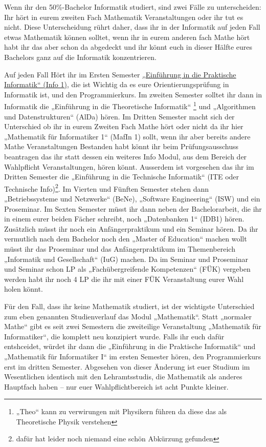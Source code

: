 Wenn ihr den 50\%-Bachelor Informatik studiert, sind zwei Fälle zu unterscheiden: Ihr hört in
eurem zweiten Fach Mathematik Veranstaltungen oder ihr tut es nicht. Diese
Unterscheidung rührt daher, dass ihr in der Informatik auf jeden Fall etwas
Mathematik können solltet, wenn ihr in eurem anderen fach Mathe hört habt ihr das aber
schon da abgedeckt und ihr könnt euch in dieser Hälfte eures Bachelors ganz auf die Informatik konzentrieren.

Auf jeden Fall Hört ihr im Ersten Semester \hyperref[info1]{„Einführung in die Praktische Informatik“ (Info 1)},
die ist Wichtig da es eure Orientierungsprüfung in Informatik ist, und den Programmierkurs.
Im zweiten Semester solltet ihr dann in Informatik die „Einführung in die Theoretische Informatik“
\footnote{„Theo“ kann zu verwirungen mit Physikern führen da diese das als Theoretische Physik verstehen}
und „Algorithmen und Datenstrukturen“ (AlDa) hören. Im Dritten Semester macht sich der Unterschied 
ob ihr in eurem Zweiten Fach Mathe hört oder nicht da ihr hier „Mathematik für Informatiker 1“ (MafIn 1) sollt,
wenn ihr aber bereits andere Mathe Veranstaltungen Bestanden habt könnt ihr beim Prüfungsausschuss beantragen
das ihr statt dessen ein weiteres Info Modul, aus dem Bereich der Wahlpflicht Veranstaltungen, hören könnt.
Ausserdem ist vorgesehen das ihr im Dritten Semester die „Einführung in die Technische Informatik“
(ITE oder Technische Info)\footnote{dafür hat leider noch niemand eine schön Abkürzung gefunden}.
Im Vierten und Fünften Semester stehen dann „Betriebssysteme und Netzwerke“ (BeNe),
„Software Engineering“ (ISW) und ein Proseminar. Im Sexten Semester müsst ihr dann neben der Bachelorarbeit,
die ihr in einem eurer beiden Fächer schreibt, noch „Datenbanken 1“ (IDB1) hören.
Zusätzlich müsst ihr noch ein Anfängerpraktikum und ein Seminar hören.
Da ihr vermutlich nach dem Bachelor noch den „Master of Education“ machen wollt müsst ihr 
das Proseminar und das Anfängerpraktikum im Themenbereich „Informatik und Gesellschaft“ (IuG)
machen. Da im Seminar und Proseminar und Seminar schon LP als „Fachübergreifende Kompetenzen“ (FÜK)
vergeben werden habt ihr noch 4 LP die ihr mit einer FÜK Veranstaltung eurer Wahl holen könnt.

Für den Fall, dass ihr keine Mathematik studiert, ist der wichtigste
Unterschied zum eben genannten Studienverlauf das Modul
„Mathematik“. Statt „normaler Mathe“ gibt es seit zwei Semestern die zweiteilige Veranstaltung „Mathematik für
Informatiker“, die komplett neu konzipiert wurde. Falls ihr euch dafür entshceidet, würdet ihr dann die
„Einführung in die Praktische Informatik“ und „Mathematik für Informatiker I“ im ersten Semester
hören, den Programmierkurs erst im dritten Semester. Abgesehen von
dieser Änderung ist euer Studium im Wesentlichen identisch mit den
Lehramtsstudis, die Mathematik als anderes Hauptfach haben -- nur euer
Wahlpflichtbereich ist acht Punkte kleiner.

